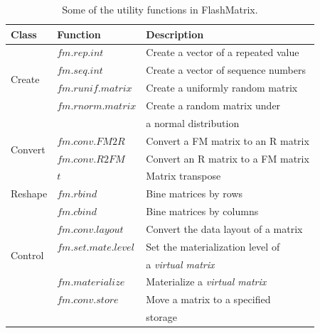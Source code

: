 \begin{table}
\begin{center}
\footnotesize
\begin{tabular}{|l|l|l|}
\hline
Class & Function & Description \\
\hline
\multirow{4}{*}{Create} & $fm.rep.int$ & Create a vector of a repeated value \\
& $fm.seq.int$ & Create a vector of sequence numbers \\
& $fm.runif.matrix$ & Create a uniformly random matrix  \\
& $fm.rnorm.matrix$ & Create a random matrix under \\ & & a normal distribution \\
\hline
\multirow{2}{*}{Convert} & $fm.conv.FM2R$ & Convert a FM matrix to an R matrix \\
& $fm.conv.R2FM$ & Convert an R matrix to a FM matrix \\
\hline
\multirow{3}{*}{Reshape} & $t$ & Matrix transpose \\
& $fm.rbind$ & Bine matrices by rows \\
& $fm.cbind$ & Bine matrices by columns \\
\hline
\multirow{4}{*}{Control} & $fm.conv.layout$ & Convert the data layout of a matrix \\
& $fm.set.mate.level$ & Set the materialization level of \\ & & a \textit{virtual matrix} \\
& $fm.materialize$ & Materialize a \textit{virtual matrix} \\
& $fm.conv.store$ & Move a matrix to a specified \\ & & storage \\
\hline
\end{tabular}
\normalsize
\end{center}
\caption{Some of the utility functions in FlashMatrix.}
\label{tbl:utility}
\end{table}

